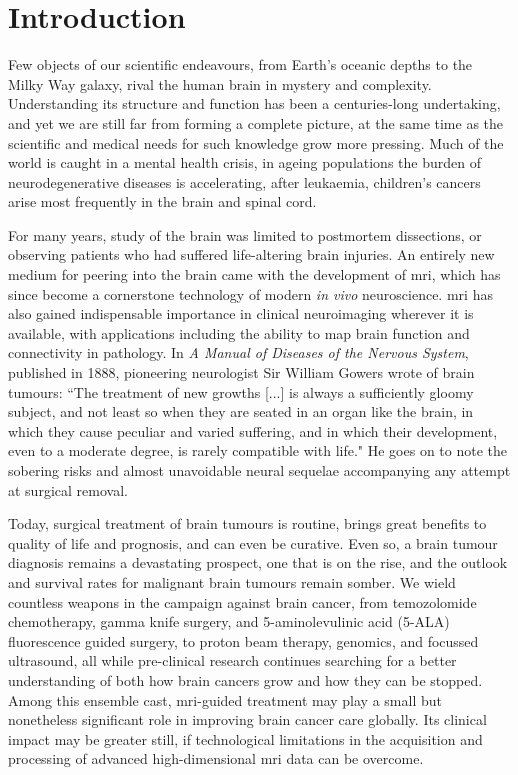 \chapter*{Introduction}
\label{chapterlabel0}

Few objects of our scientific endeavours, from Earth's oceanic depths to the Milky Way galaxy, rival the human brain in mystery and complexity.
Understanding its structure and function has been a centuries-long undertaking, and yet we are still far from forming a complete picture, at the same time as the scientific and medical needs for such knowledge grow more pressing.
Much of the world is caught in a mental health crisis\autocite{Patel2018,Liu2020,Yang2021a}, in ageing populations the burden of neurodegenerative diseases is accelerating\autocite{Deuschl2020,Li2022}, after leukaemia, children's cancers arise most frequently in the brain and spinal cord\autocite{Ostrom2015}.

For many years, study of the brain was limited to postmortem dissections, or observing patients who had suffered life-altering brain injuries.
An entirely new medium for peering into the brain came with the development of \gls{mri}, which has since become a cornerstone technology of modern \textit{in vivo} neuroscience.
\Gls{mri} has also gained indispensable importance in clinical neuroimaging wherever it is available\autocite{Geethanath2019}, with applications including the ability to map brain function and connectivity in pathology.
In \textit{A Manual of Diseases of the Nervous System}, published in 1888, pioneering neurologist Sir William Gowers wrote of brain tumours:
``The treatment of new growths [...] is always a sufficiently gloomy subject, and not least so when they are seated in an organ like the brain, in which they cause peculiar and varied suffering, and in which their development, even to a moderate degree, is rarely compatible with life."\autocite{Gowers1888}
He goes on to note the sobering risks and almost unavoidable neural sequelae accompanying any attempt at surgical removal.

Today, surgical treatment of brain tumours is routine, brings great benefits to quality of life and prognosis, and can even be curative.
Even so, a brain tumour diagnosis remains a devastating prospect, one that is on the rise, and the outlook and survival rates for malignant brain tumours remain somber\autocite{Aldape2019}.
We wield countless weapons in the campaign against brain cancer, from temozolomide chemotherapy, gamma knife surgery, and 5-aminolevulinic acid (5-ALA) fluorescence guided surgery, to proton beam therapy, genomics, and focussed ultrasound, all while pre-clinical research continues searching for a better understanding of both how brain cancers grow and how they can be stopped.
Among this ensemble cast, \gls{mri}-guided treatment may play a small but nonetheless significant role in improving brain cancer care globally.
Its clinical impact may be greater still, if technological limitations in the acquisition and processing of advanced high-dimensional \gls{mri} data can be overcome.

